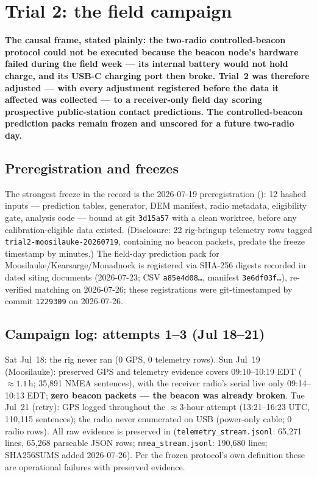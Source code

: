 \documentclass[11pt]{article}
\newcommand{\code}[1]{\texttt{\small #1}}
\begin{document}
\section{Trial 2: the field campaign}\label{sec:trial2}

\textbf{The causal frame, stated plainly: the two-radio controlled-beacon
protocol could not be executed because the beacon node's hardware failed
during the field week --- its internal battery would not hold charge, and its
USB-C charging port then broke. Trial~2 was therefore adjusted --- with every
adjustment registered before the data it affected was collected --- to a
receiver-only field day scoring prospective public-station contact
predictions. The controlled-beacon prediction packs remain frozen and
unscored for a future two-radio day.}

\subsection{Preregistration and freezes}

The strongest freeze in the record is the 2026-07-19 preregistration
(): 12 hashed inputs ---
prediction tables, generator, DEM manifest, radio metadata, eligibility gate,
analysis code --- bound at git \code{3d15a57} with a clean worktree, before
any calibration-eligible data existed. (Disclosure: 22 rig-bringup telemetry
rows tagged \code{trial2-moosilauke-20260719}, containing no beacon packets,
predate the freeze timestamp by minutes.) The field-day prediction pack for
Moosilauke/Kearsarge/Monadnock is registered via SHA-256 digests recorded in
dated siting documents (2026-07-23; CSV \code{a85e4d08\ldots}, manifest
\code{3e6df03f\ldots}), re-verified matching on 2026-07-26; these registrations were git-timestamped by commit \code{1229309} on 2026-07-26.

\subsection{Campaign log: attempts 1--3 (Jul 18--21)}

Sat Jul~18: the rig never ran (0 GPS, 0 telemetry rows). Sun Jul~19
(Moosilauke): preserved GPS and telemetry evidence covers 09:10--10:19 EDT (${\approx}1.1$\,h; 35{,}891 NMEA sentences), with the receiver radio's serial live only 09:14--10:13 EDT; \textbf{zero beacon packets --- the beacon
was already broken}. Tue Jul~21 (retry): GPS logged throughout the ${\approx}3$-hour attempt (13:21--16:23 UTC, 110{,}115 sentences); the radio never enumerated on USB (power-only cable; 0 radio rows). All raw evidence is
preserved in  (\code{telemetry\_stream.jsonl}: 65{,}271 lines, 65{,}268 parseable JSON rows; \code{nmea\_stream.jsonl}: 190{,}680 lines; SHA256SUMS added 2026-07-26). Per the frozen
protocol's own definition these are operational failures with preserved evidence.
\end{document}
